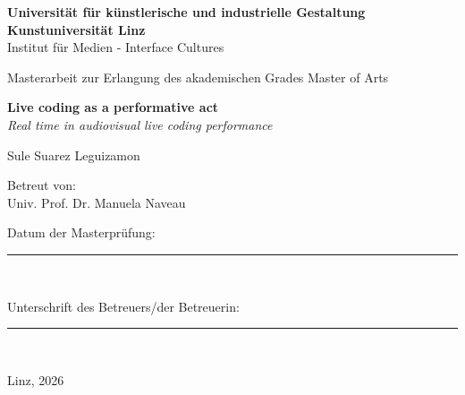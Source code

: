 \documentclass[12pt, twoside, a4paper]{report}
\begin{document}

\begin{center}
  \Large
  \textbf{Universit\"at f\"ur k\"unstlerische und industrielle Gestaltung Kunstuniversit\"at Linz} \\
  Institut f\"ur Medien - Interface Cultures \\

  \vspace{1.5cm}

  \large
  Masterarbeit zur Erlangung des akademischen Grades Master of Arts \\

  \vspace{2.5cm}

  \Huge
  \textbf{Live coding as a performative act} \\
 \large
  \textit{Real time in audiovisual live coding performance} \\
  

  \vspace{2cm}

  \Large
  Sule Suarez Leguizamon \\

  \vspace{2.5cm}

  \normalsize
  Betreut von: \\
  Univ. Prof. Dr. Manuela Naveau \\

  \vspace{1.5cm}

  Datum der Masterpr\"ufung: \\
  \vspace{0.8cm} \rule{6cm}{0.4pt} \\

  \vspace{1.5cm}

  Unterschrift des Betreuers/der Betreuerin: \\
  \vspace{0.8cm} \rule{6cm}{0.4pt} \\

  \vfill

  Linz, 2026
\end{center}
\end{document}
